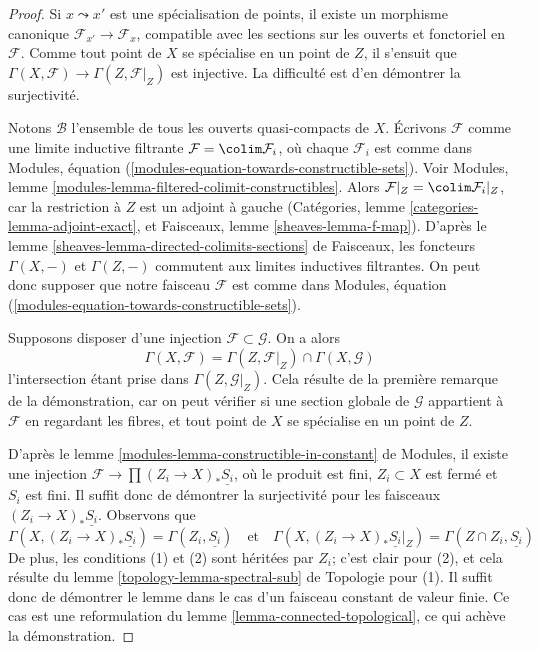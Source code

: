 \begin{proof}
Si $x \leadsto x'$ est une spécialisation de points, il existe un
morphisme canonique $\mathcal{F}_{x'} \to \mathcal{F}_x$, compatible avec les
sections sur les ouverts et fonctoriel en $\mathcal{F}$. Comme tout point
de $X$ se spécialise en un point de $Z$, il s'ensuit que
$\Gamma(X, \mathcal{F}) \to \Gamma(Z, \mathcal{F}|_Z)$ est injective.
La difficulté est d'en démontrer la surjectivité.

\medskip\noindent
Notons $\mathcal{B}$ l'ensemble de tous les ouverts quasi-compacts de $X$.
Écrivons $\mathcal{F}$ comme une limite inductive filtrante $\mathcal{F} = \colim \mathcal{F}_i$,
où chaque $\mathcal{F}_i$ est comme dans
Modules, équation (\ref{modules-equation-towards-constructible-sets}).
Voir Modules, lemme \ref{modules-lemma-filtered-colimit-constructibles}.
Alors $\mathcal{F}|_Z = \colim \mathcal{F}_i|_Z$, car la restriction à $Z$
est un adjoint à gauche (Catégories, lemme \ref{categories-lemma-adjoint-exact}, et
Faisceaux, lemme \ref{sheaves-lemma-f-map}).
D'après le lemme \ref{sheaves-lemma-directed-colimits-sections} de Faisceaux,
les foncteurs $\Gamma(X, -)$ et $\Gamma(Z, -)$ commutent aux limites inductives filtrantes.
On peut donc supposer que notre faisceau $\mathcal{F}$ est comme dans
Modules, équation (\ref{modules-equation-towards-constructible-sets}).

\medskip\noindent
Supposons disposer d'une injection $\mathcal{F} \subset \mathcal{G}$.
On a alors
$$
\Gamma(X, \mathcal{F}) =
\Gamma(Z, \mathcal{F}|_Z) \cap \Gamma(X, \mathcal{G})
$$
l'intersection étant prise dans $\Gamma(Z, \mathcal{G}|_Z)$.
Cela résulte de la première remarque de la démonstration, car on peut vérifier
si une section globale de $\mathcal{G}$ appartient à $\mathcal{F}$ en regardant
les fibres, et tout point de $X$ se spécialise en un point de $Z$.

\medskip\noindent
D'après le lemme \ref{modules-lemma-constructible-in-constant} de Modules,
il existe une injection $\mathcal{F} \to \prod (Z_i \to X)_*\underline{S_i}$,
où le produit est fini, $Z_i \subset X$ est fermé et $S_i$ est fini.
Il suffit donc de démontrer la surjectivité pour les faisceaux
$(Z_i \to X)_*\underline{S_i}$. Observons que
$$
\Gamma(X, (Z_i \to X)_*\underline{S_i}) = \Gamma(Z_i, \underline{S_i})
\quad\text{et}\quad
\Gamma(X, (Z_i \to X)_*\underline{S_i}|_Z) =
\Gamma(Z \cap Z_i, \underline{S_i})
$$
De plus, les conditions (1) et (2) sont héritées par $Z_i$; c'est clair
pour (2), et cela résulte du
lemme \ref{topology-lemma-spectral-sub} de Topologie pour (1). Il
suffit donc de démontrer le lemme dans le cas d'un faisceau constant de valeur finie.
Ce cas est une reformulation du lemme \ref{lemma-connected-topological},
ce qui achève la démonstration.
\end{proof}

